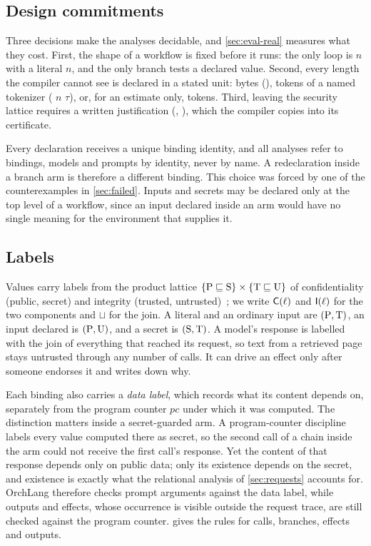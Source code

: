 \subsection{Design commitments}

Three decisions make the analyses decidable, and \cref{sec:eval-real} measures what
they cost. First, the shape of a workflow is fixed before it runs: the only loop is
 $n$ with a literal $n$, and the only branch tests a declared value.
Second, every length the compiler cannot see is declared in a stated unit: bytes
(), tokens of a named tokenizer ( $n$
 $\tau$), or, for an estimate only, tokens. Third, leaving the
security lattice requires a written justification (,
), which the compiler copies into its certificate.

Every declaration receives a unique binding identity, and all analyses refer to
bindings, models and prompts by identity, never by name. A redeclaration inside a
branch arm is therefore a different binding. This choice was forced by one of the
counterexamples in \cref{sec:failed}. Inputs and secrets may be declared only at
the top level of a workflow, since an input declared inside an arm would have no
single meaning for the environment that supplies it.

\subsection{Labels}\label{sec:labels}

Values carry labels from the product lattice
$\{\mathrm{P} \sqsubseteq \mathrm{S}\} \times \{\mathrm{T} \sqsubseteq \mathrm{U}\}$ of confidentiality
(public, secret) and integrity (trusted, untrusted)~\cite{denning1976lattice}; we
write $\mathsf{C}(\ell)$ and $\mathsf{I}(\ell)$ for the two components and $\sqcup$ for the
join. A literal and an ordinary input are $(\mathrm{P},\mathrm{T})$, an input declared
 is $(\mathrm{P},\mathrm{U})$, and a secret is $(\mathrm{S},\mathrm{T})$. A model's
response is labelled with the join of everything that reached its request, so text
from a retrieved page stays untrusted through any number of calls. It can drive an
effect only after someone endorses it and writes down why.

Each binding also carries a \emph{data label}, which records what its content
depends on, separately from the program counter $pc$ under which it was computed.
The distinction matters inside a secret-guarded arm. A program-counter discipline
labels every value computed there as secret, so the second call of a chain inside
the arm could not receive the first call's response. Yet the content of that
response depends only on public data; only its existence depends on the secret,
and existence is exactly what the relational analysis of \cref{sec:requests}
accounts for. OrchLang therefore checks prompt arguments against the data label,
while outputs and effects, whose occurrence is visible outside the request trace,
are still checked against the program counter.  gives the rules for
calls, branches, effects and outputs.

